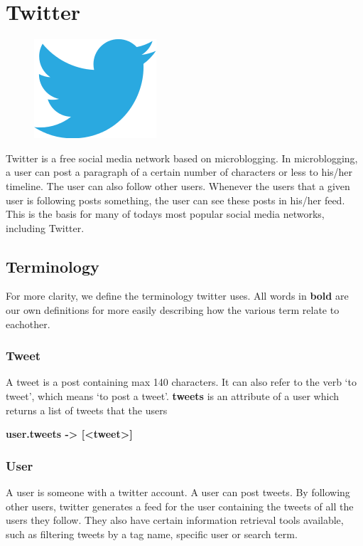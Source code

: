 \section{Twitter}\label{sec:twitter}

\begin{figure}
\vspace{-30pt}
\centering
\includegraphics[width = .25\textwidth]{image/twitter-logo.png}
\end{figure}
Twitter is a free social media network based on microblogging. In microblogging, a user can post a paragraph of a certain number of characters or less to his/her timeline. The user can also follow other users. Whenever the users that a given user is following posts something, the user can see these posts in his/her feed. This is the basis for many of todays most popular social media networks, including Twitter.

\subsection{Terminology}
For more clarity, we define the terminology twitter uses. All words in \textbf{bold} are our own definitions for more easily describing how the various term relate to eachother.

\subsubsection{Tweet}
A tweet is a post containing max 140 characters. It can also refer to the verb ‘to tweet’, which means ‘to post a tweet’. \textbf{tweets} is an attribute of a user which returns a list of tweets that the users

  \textbf{user.tweets -> [<tweet>]}
\subsubsection{User}
A user is someone with a twitter account. A user can post tweets. By following other users, twitter generates a feed for the user containing the tweets of all the users they follow. They also have certain information retrieval tools available, such as filtering tweets by a tag name, specific user or search term.

